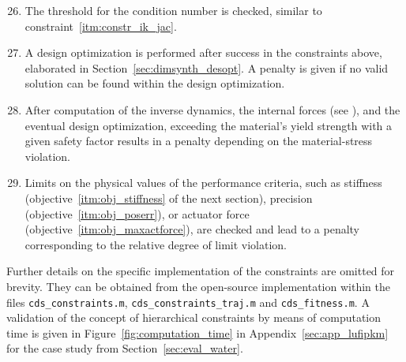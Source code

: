 \begin{enumerate}
  \setcounter{enumi}{25}
  \item \label{itm:constr_jac_traj} The threshold for the condition number is checked, similar to constraint~\ref*{itm:constr_ik_jac}.
  \item \label{itm:constr_desopt} A design optimization is performed after success in the constraints above, elaborated in Section~\ref{sec:dimsynth_desopt}. A penalty is given if no valid solution can be found within the design optimization. %
  \newpage %
  \item \label{itm:constr_materialstress} After computation of the inverse dynamics, the internal forces (see \cite{SchapplerOrt2020}), and the eventual design optimization, exceeding the material's yield strength with a given safety factor results in a penalty depending on the material-stress violation.
  \item \label{itm:constr_obj} Limits on the physical values of the performance criteria, such as stiffness (objective~\ref{itm:obj_stiffness} of the next section), precision (objective~\ref{itm:obj_poserr}), or actuator force (objective~\ref{itm:obj_maxactforce}), are checked and lead to a penalty corresponding to the relative degree of limit violation.
\end{enumerate}


Further details on the specific implementation of the constraints are omitted for brevity. 
They can be obtained from the open-source implementation \cite{GitHub_StructDimSynth} within the files \texttt{cds\_constraints.m}, \texttt{cds\_constraints\_traj.m} and \texttt{cds\_fitness.m}.
{A validation of the concept of hierarchical constraints  by means of computation time is given in Figure~\ref{fig:computation_time} in Appendix~\ref{sec:app_lufipkm} for the case study from Section~\ref{sec:eval_water}.}
